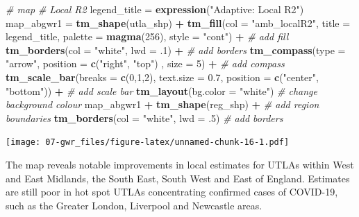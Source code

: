 \documentclass[]{book}
\newenvironment{Shaded}{\begin{snugshade}}{\end{snugshade}}
\newcommand{\KeywordTok}[1]{\textcolor[rgb]{0.13,0.29,0.53}{\textbf{#1}}}
\newcommand{\DataTypeTok}[1]{\textcolor[rgb]{0.13,0.29,0.53}{#1}}
\newcommand{\DecValTok}[1]{\textcolor[rgb]{0.00,0.00,0.81}{#1}}
\newcommand{\FloatTok}[1]{\textcolor[rgb]{0.00,0.00,0.81}{#1}}
\newcommand{\StringTok}[1]{\textcolor[rgb]{0.31,0.60,0.02}{#1}}
\newcommand{\CommentTok}[1]{\textcolor[rgb]{0.56,0.35,0.01}{\textit{#1}}}
\newcommand{\OperatorTok}[1]{\textcolor[rgb]{0.81,0.36,0.00}{\textbf{#1}}}
\newcommand{\NormalTok}[1]{#1}
\begin{document}
\begin{Shaded}
\begin{Highlighting}[]
\CommentTok{# map}
  \CommentTok{# Local R2}
\NormalTok{legend_title =}\StringTok{ }\KeywordTok{expression}\NormalTok{(}\StringTok{"Adaptive: Local R2"}\NormalTok{)}
\NormalTok{map_abgwr1 =}\StringTok{ }\KeywordTok{tm_shape}\NormalTok{(utla_shp) }\OperatorTok{+}
\StringTok{  }\KeywordTok{tm_fill}\NormalTok{(}\DataTypeTok{col =} \StringTok{"amb_localR2"}\NormalTok{, }\DataTypeTok{title =}\NormalTok{ legend_title, }\DataTypeTok{palette =} \KeywordTok{magma}\NormalTok{(}\DecValTok{256}\NormalTok{), }\DataTypeTok{style =} \StringTok{"cont"}\NormalTok{) }\OperatorTok{+}\StringTok{ }\CommentTok{# add fill}
\StringTok{  }\KeywordTok{tm_borders}\NormalTok{(}\DataTypeTok{col =} \StringTok{"white"}\NormalTok{, }\DataTypeTok{lwd =}\NormalTok{ .}\DecValTok{1}\NormalTok{)  }\OperatorTok{+}\StringTok{ }\CommentTok{# add borders}
\StringTok{  }\KeywordTok{tm_compass}\NormalTok{(}\DataTypeTok{type =} \StringTok{"arrow"}\NormalTok{, }\DataTypeTok{position =} \KeywordTok{c}\NormalTok{(}\StringTok{"right"}\NormalTok{, }\StringTok{"top"}\NormalTok{) , }\DataTypeTok{size =} \DecValTok{5}\NormalTok{) }\OperatorTok{+}\StringTok{ }\CommentTok{# add compass}
\StringTok{  }\KeywordTok{tm_scale_bar}\NormalTok{(}\DataTypeTok{breaks =} \KeywordTok{c}\NormalTok{(}\DecValTok{0}\NormalTok{,}\DecValTok{1}\NormalTok{,}\DecValTok{2}\NormalTok{), }\DataTypeTok{text.size =} \FloatTok{0.7}\NormalTok{, }\DataTypeTok{position =}  \KeywordTok{c}\NormalTok{(}\StringTok{"center"}\NormalTok{, }\StringTok{"bottom"}\NormalTok{)) }\OperatorTok{+}\StringTok{ }\CommentTok{# add scale bar}
\StringTok{  }\KeywordTok{tm_layout}\NormalTok{(}\DataTypeTok{bg.color =} \StringTok{"white"}\NormalTok{) }\CommentTok{# change background colour}
\NormalTok{map_abgwr1 }\OperatorTok{+}\StringTok{ }\KeywordTok{tm_shape}\NormalTok{(reg_shp) }\OperatorTok{+}\StringTok{ }\CommentTok{# add region boundaries}
\StringTok{  }\KeywordTok{tm_borders}\NormalTok{(}\DataTypeTok{col =} \StringTok{"white"}\NormalTok{, }\DataTypeTok{lwd =}\NormalTok{ .}\DecValTok{5}\NormalTok{) }\CommentTok{# add borders}
\end{Highlighting}
\end{Shaded}

\texttt{[image: 07-gwr\_files/figure-latex/unnamed-chunk-16-1.pdf]}

The map reveals notable improvements in local estimates for UTLAs within
West and East Midlands, the South East, South West and East of England.
Estimates are still poor in hot spot UTLAs concentrating confirmed cases
of COVID-19, such as the Greater London, Liverpool and Newcastle areas.
\end{document}
